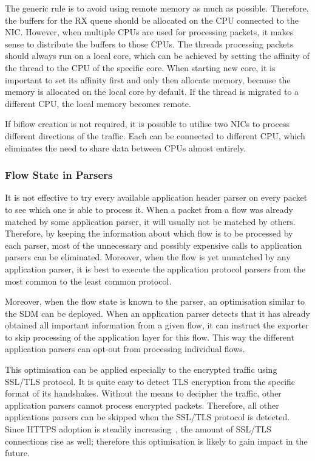 The generic rule is to avoid using remote memory as much as possible. Therefore, the buffers for the RX queue should be allocated on the CPU connected to the NIC. However, when multiple CPUs are used for processing packets, it makes sense to distribute the buffers to those CPUs. The threads processing packets should always run on a local core, which can be achieved by setting the affinity of the thread to the CPU of the specific core. When starting new core, it is important to set its affinity first and only then allocate memory, because the memory is allocated on the local core by default. If the thread is migrated to a different CPU, the local memory becomes remote.

If biflow creation is not required, it is possible to utilise two NICs to process different directions of the traffic. Each can be connected to different CPU, which eliminates the need to share data between CPUs almost entirely.

\subsubsection{Flow State in Parsers}

It is not effective to try every available application header parser on every packet to see which one is able to process it. When a packet from a flow was already matched by some application parser, it will usually not be matched by others. Therefore, by keeping the information about which flow is to be processed by each parser, most of the unnecessary and possibly expensive calls to application parsers can be eliminated. Moreover, when the flow is yet unmatched by any application parser, it is best to execute the application protocol parsers from the most common to the least common protocol.

Moreover, when the flow state is known to the parser, an optimisation similar to the SDM can be deployed. When an application parser detects that it has already obtained all important information from a given flow, it can instruct the exporter to skip processing of the application layer for this flow. This way the different application parsers can opt-out from processing individual flows.

This optimisation can be applied especially to the encrypted traffic using SSL/TLS protocol. It is quite easy to detect TLS encryption from the specific format of its handshakes. Without the means to decipher the traffic, other application parsers cannot process encrypted packets. Therefore, all other applications parsers can be skipped when the SSL/TLS protocol is detected. Since HTTPS adoption is steadily increasing~\cite{Felt-2017-Measuring}, the amount of SSL/TLS connections rise as well; therefore this optimisation is likely to gain impact in the future.

